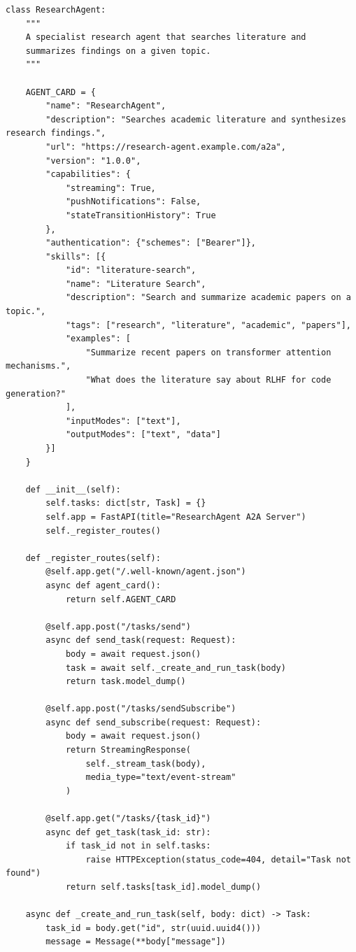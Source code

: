 \begin{lstlisting}[style=pythonstyle]
class ResearchAgent:
    """
    A specialist research agent that searches literature and
    summarizes findings on a given topic.
    """

    AGENT_CARD = {
        "name": "ResearchAgent",
        "description": "Searches academic literature and synthesizes research findings.",
        "url": "https://research-agent.example.com/a2a",
        "version": "1.0.0",
        "capabilities": {
            "streaming": True,
            "pushNotifications": False,
            "stateTransitionHistory": True
        },
        "authentication": {"schemes": ["Bearer"]},
        "skills": [{
            "id": "literature-search",
            "name": "Literature Search",
            "description": "Search and summarize academic papers on a topic.",
            "tags": ["research", "literature", "academic", "papers"],
            "examples": [
                "Summarize recent papers on transformer attention mechanisms.",
                "What does the literature say about RLHF for code generation?"
            ],
            "inputModes": ["text"],
            "outputModes": ["text", "data"]
        }]
    }

    def __init__(self):
        self.tasks: dict[str, Task] = {}
        self.app = FastAPI(title="ResearchAgent A2A Server")
        self._register_routes()

    def _register_routes(self):
        @self.app.get("/.well-known/agent.json")
        async def agent_card():
            return self.AGENT_CARD

        @self.app.post("/tasks/send")
        async def send_task(request: Request):
            body = await request.json()
            task = await self._create_and_run_task(body)
            return task.model_dump()

        @self.app.post("/tasks/sendSubscribe")
        async def send_subscribe(request: Request):
            body = await request.json()
            return StreamingResponse(
                self._stream_task(body),
                media_type="text/event-stream"
            )

        @self.app.get("/tasks/{task_id}")
        async def get_task(task_id: str):
            if task_id not in self.tasks:
                raise HTTPException(status_code=404, detail="Task not found")
            return self.tasks[task_id].model_dump()

    async def _create_and_run_task(self, body: dict) -> Task:
        task_id = body.get("id", str(uuid.uuid4()))
        message = Message(**body["message"])


\end{lstlisting}
